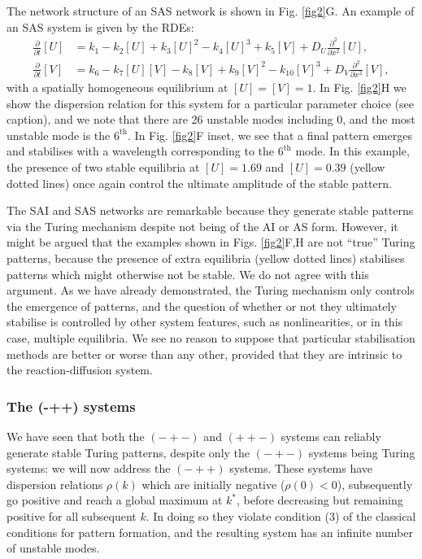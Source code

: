 The network structure of an SAS network is shown in Fig. \ref{fig2}G. An example of an SAS system is given by the RDEs:
\begin{align}\label{sas}
\frac{\partial}{\partial t} [U]&= k_1-k_2[U]+k_3[U]^2-k_4[U]^3+k_5[V]+D_U\frac{\partial^2}{\partial x^2}[U],\\
\frac{\partial}{\partial t} [V]&=k_6-k_7[U][V]-k_8[V]+k_9[V]^2-k_{10}[V]^3+D_V\frac{\partial^2}{\partial x^2}[V],\nonumber
\end{align}
with a spatially homogeneous equilibrium at $[U]=[V]=1$. In Fig. \ref{fig2}H we show the dispersion relation for this system for a particular parameter choice (see caption), and we note that there are 26 unstable modes including 0, and the most unstable mode is the $6^\text{th}$. In Fig. \ref{fig2}F inset, we see that a final pattern emerges and stabilises with a wavelength corresponding to the $6^\text{th}$ mode. In this example, the presence of two stable equilibria at $[U]=1.69$ and $[U]=0.39$ (yellow dotted lines) once again control the ultimate amplitude of the stable pattern.

The SAI and SAS networks are remarkable because they generate stable patterns via the Turing mechanism despite not being of the AI or AS form. However, it might be argued that the examples shown in Figs. \ref{fig2}F,H are not ``true'' Turing patterns, because the presence of extra equilibria (yellow dotted lines) stabilises patterns which might otherwise not be stable. We do not agree with this argument. As we have already demonstrated, the Turing mechanism only controls the emergence of patterns, and the question of whether or not they ultimately stabilise is controlled by other system features, such as nonlinearities, or in this case, multiple equilibria. We see no reason to suppose that particular stabilisation methods are better or worse than any other, provided that they are intrinsic to the reaction-diffusion system.

\subsubsection*{The (-++) systems}

We have seen that both the $(-+-)$ and $(++-)$ systems can reliably generate stable Turing patterns, despite only the $(-+-)$ systems being Turing systems: we will now address the $(-++)$ systems. These systems have dispersion relations $\rho(k)$ which are initially negative ($\rho(0)<0$), subsequently go positive and reach a global maximum at $k^*$, before decreasing but remaining positive for all subsequent $k$. In doing so they violate condition (3) of the classical conditions for pattern formation, and the resulting system has an infinite number of unstable modes. 

